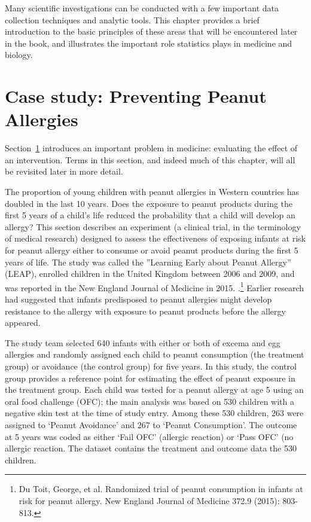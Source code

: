 \begin{doublespace}
Many scientific investigations can be conducted with a few important data collection techniques and analytic tools. This chapter provides a brief introduction to the basic principles of these areas that will be encountered later in the book, and illustrates the important role statistics plays in medicine and biology.

\section[Case study]{Case study: Preventing Peanut Allergies}
\label{basicExampleOfPeanutAllergies}


 Section~\ref{basicExampleOfPeanutAllergies} introduces an important problem in medicine: evaluating the effect of an intervention. Terms in this section, and indeed much of this chapter, will all be revisited later in more detail.

The proportion of young children with peanut allergies in Western countries has doubled in the last 10 years. Does the exposure to peanut products during the first 5 years of a child's life reduced the probability that a child will develop an allergy?  This section describes an experiment (a clinical trial, in the terminology of medical research) designed to assess the effectiveness of exposing infants at risk for peanut allergy either to consume or avoid peanut products during the first 5 years of life.  The study was called the ''Learning Early about Peanut Allergy'' (LEAP), enrolled children in the United Kingdom between 2006 and 2009, and was reported in the New England Journal of Medicine in 2015. .\footnote{Du Toit, George, et al. Randomized trial of peanut consumption in infants at risk for peanut allergy. New England Journal of Medicine 372.9 (2015): 803-813.}  Earlier research had suggested that infants predisposed to peanut allergies might develop resistance to the allergy with exposure to peanut products before the allergy appeared.

The study team selected 640 infants with either or both of excema and egg allergies and randomly assigned each child to peanut consumption (the treatment group) or avoidance (the control group) for five years. In this study, the control group provides a reference point for estimating the effect of peanut exposure in the treatment group. Each child was tested for a peanut allergy at age 5 using an oral food challenge (OFC); the main analysis was based on 530 children with a negative skin test at the time of study entry. Among these 530 children, 263 were assigned to `Peanut Avoidance' and 267 to `Peanut Consumption'. The outcome at 5 years was coded as either `Fail OFC' (allergic reaction) or `Pass OFC' (no allergic reaction. The dataset  contains the treatment and outcome data the 530 children.


\end{doublespace}

